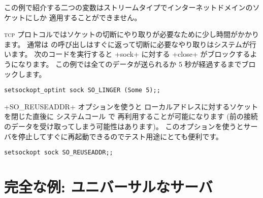 \begin{example}
この例で紹介する二つの変数はストリームタイプでインターネットドメインのソケットにしか
適用することができません。

\textsc{tcp} プロトコルではソケットの切断にやり取りが必要なために少し時間がかかります。
通常は  の呼び出しはすぐに返って切断に必要なやり取りはシステムが行います。
次のコードを実行すると \ml+sock+ に対する \ml+close+ がブロックするようになります。
この例では全てのデータが送られるか 5 秒が経過するまでブロックします。
%
\begin{lstlisting}
setsockopt_optint sock SO_LINGER (Some 5);;
\end{lstlisting}
%

\ml+SO_REUSEADDR+ オプションを使うと
ローカルアドレスに対するソケットを閉じた直後に システムコール  で
再利用することが可能になります (前の接続のデータを受け取ってしまう可能性はあります)。
このオプションを使うとサーバを停止してすぐに再起動できるのでテスト用途にとても便利です。
%
\begin{lstlisting}
setsockopt sock SO_REUSEADDR;;
\end{lstlisting}
\end{example}

\section{完全な例: ユニバーサルなサーバ}

